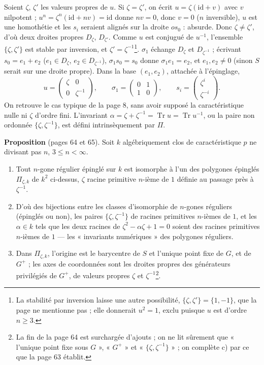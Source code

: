 \documentclass[11pt,a4paper]{article}
\begin{document}
Soient $\zeta$, $\zeta'$ les valeurs propres de $u$. Si $\zeta = \zeta'$, on
écrit $u = \zeta(\mathrm{id} + v)$ avec $v$ nilpotent ; $u^n = \zeta^n
(\mathrm{id} + n v) = \mathrm{id}$ donne $nv = 0$, donc $v = 0$ ($n$
inversible), $u$ est une homothétie et les $s_i$ seraient alignés sur la
droite $o s_0$ : absurde. Donc $\zeta \neq \zeta'$, d'où deux droites
propres $D_\zeta$, $D_{\zeta'}$. Comme $u$ est conjugué de $u^{-1}$, l'ensemble
$\{\zeta, \zeta'\}$ est stable par inversion, et $\zeta' =
\zeta^{-1}$\footnote{La stabilité par inversion laisse une autre
possibilité, $\{\zeta, \zeta'\} = \{1, -1\}$, que la page ne mentionne pas ;
elle donnerait $u^2 = 1$, exclu puisque $u$ est d'ordre $n \geq 3$.}.
$\sigma_1$ échange $D_\zeta$ et $D_{\zeta^{-1}}$ ; écrivant $s_0 = e_1 + e_2$
($e_1 \in D_\zeta$, $e_2 \in D_{\zeta^{-1}}$), $\sigma_1 s_0 = s_0$ donne
$\sigma_1 e_1 = e_2$, et $e_1, e_2 \neq 0$ (sinon $S$ serait sur une droite
propre). Dans la base $(e_1, e_2)$, attachée à l'épinglage,
\[
  u = \begin{pmatrix} \zeta & 0 \\ 0 & \zeta^{-1} \end{pmatrix}, \qquad
  \sigma_1 = \begin{pmatrix} 0 & 1 \\ 1 & 0 \end{pmatrix}, \qquad
  s_i = \begin{pmatrix} \zeta^i \\ \zeta^{-i} \end{pmatrix} .
\]
On retrouve le cas typique de la page 8, sans avoir supposé la caractéristique
nulle ni $\zeta$ d'ordre fini. L'invariant $\alpha = \zeta + \zeta^{-1} =
\operatorname{Tr} u = \operatorname{Tr} u^{-1}$, ou la paire non ordonnée
$\{\zeta, \zeta^{-1}\}$, est défini intrinsèquement par $\Pi$.

\textbf{Proposition} (pages 64 et 65). Soit $k$ algébriquement clos de
caractéristique $p$ ne divisant pas $n$, $3 \leq n < \infty$.
\begin{enumerate}
  \item[a)] Tout $n$-gone régulier épinglé sur $k$ est isomorphe à l'un des
    polygones épinglés $\Pi_{\zeta, k}$ de $k^2$ ci-dessus, $\zeta$ racine
    primitive $n$-ième de $1$ définie au passage près à $\zeta^{-1}$.
  \item[b)] D'où des bijections entre les classes d'isomorphie de $n$-gones
    réguliers (épinglés ou non), les paires $\{\zeta, \zeta^{-1}\}$ de racines
    primitives $n$-ièmes de $1$, et les $\alpha \in k$ tels que les deux
    racines de $\zeta^2 - \alpha \zeta + 1 = 0$ soient des racines primitives
    $n$-ièmes de $1$ --- les « invariants numériques » des polygones
    réguliers.
  \item[c)] Dans $\Pi_{\zeta, k}$, l'origine est le barycentre de $S$ et
    l'unique point fixe de $G$, et de $G^{+}$ ; les axes de coordonnées sont
    les droites propres des générateurs privilégiés de $G^{+}$, de valeurs
    propres $\zeta$ et $\zeta^{-1}$\footnote{La fin de la page 64 est
    surchargée d'ajouts ; on ne lit sûrement que « l'unique point fixe sous
    $G$ », « $G^{+}$ » et « $\{\zeta, \zeta^{-1}\}$ » ; on complète c) par ce
    que la page 63 établit.}.
\end{enumerate}
\end{document}

